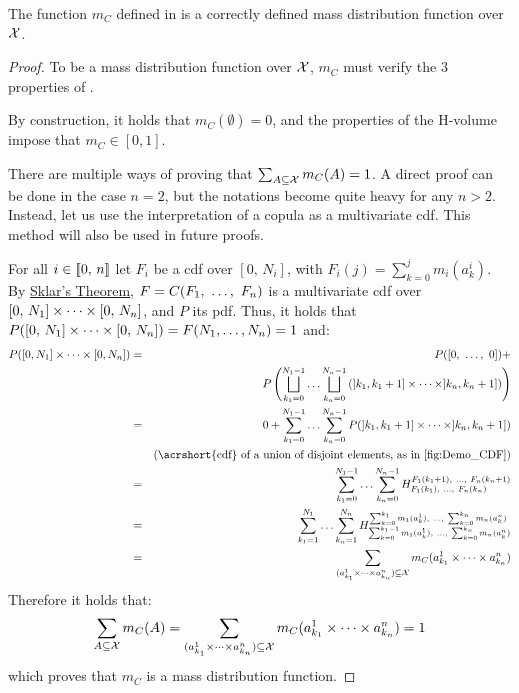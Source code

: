 \begin{proposition}
    The function $m_C$ defined in  is a correctly defined mass distribution function over $\mathcal{X}$. 
\end{proposition}
\begin{proof}
    To be a mass distribution function over $\mathcal{X}$, $m_C$ must verify the 3 properties of .
    
    By construction, it holds that $m_C(\emptyset)=0$, and the properties of the H-volume impose that $m_C\in[0,1]$.
    
    There are multiple ways of proving that $\sum_{A\subseteq\mathcal{X}}m_C(A)=1$. A direct proof can be done in the case $n=2$, but the notations become quite heavy for any $n>2$. Instead, let us use the interpretation of a copula as a multivariate \acrshort{cdf}. This method will also be used in future proofs.
    
    For all \(i\in[\![ 0,\, n]\!]\) let $F_i$ be a \acrshort{cdf} over $[0,\, N_i]$, with $F_i(j)=\sum_{k=0}^j m_i(a_k^i)$. By \hyperref[theorem:sklar]{Sklar's Theorem}, $F=C(F_1 , ~\ldots, ~  F_n)$ is a multivariate \acrshort{cdf} over $[0,\, N_1]\times\dots\times[0,\, N_n]$, and $P$ its \acrshort{pdf}. Thus, it holds that $P([0,\, N_1]\times\dots\times[0,\, N_n])=F(N_1,\ldots,N_n)=1$ and:
    \begin{eqnarray*}
        P([0, N_1]\tdt[0, N_n]) &=& P([0, ~\ldots, ~0])+\\
        &&P\left(\bigsqcup_{k_1=0}^{N_1-1}\ldots\bigsqcup_{k_n=0}^{N_n-1}\left(]k_1, k_1+1]\tdt]k_n, k_n+1]\right)\right)\\
        &=& 0 + \sum_{k_1=0}^{N_1-1}\ldots\sum_{k_n=0}^{N_n-1} P(]k_1, k_1+1]\tdt]k_n, k_n+1])\\
        && \text{(\acrshort{cdf} of a union of disjoint elements, as in \Cref{fig:Demo_CDF})}\\
        &=& \sum_{k_1=0}^{N_1-1}\ldots\sum_{k_n=0}^{N_n-1} H_{F_1(k_1) \enum F_n(k_n)}^{F_1(k_1+1) \enum F_n(k_n+1)}\\
        &=& \sum_{k_1=1}^{N_1}\ldots\sum_{k_n=1}^{N_n} H_{\sum_{k=0}^{k_1-1}m_1(a^1_k) \enum \sum_{k=0}^{k_n}m_n(a^n_k)}^{\sum_{k=0}^{k_1}m_1(a^1_k) \enum \sum_{k=0}^{k_n}m_n(a^n_k)}\\
        &=& \sum_{(a^1_{k_1}\tdt a^n_{k_n})\subseteq\X}m_C(a^1_{k_1}\tdt a^n_{k_n})
    \end{eqnarray*}
Therefore it holds that:
\begin{eqnarray}
    \sum_{A\subseteq\mathcal{X}}m_C(A)=\sum_{(a^1_{k_1}\times\dots\times a^n_{k_n})\subseteq\mathcal{X}}m_C(a^1_{k_1}\times\dots\times a^n_{k_n})=1
\end{eqnarray}
which proves that $m_C$ is a mass distribution function.


\end{proof}
